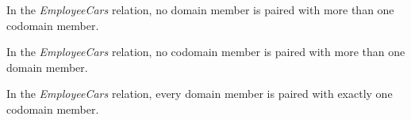 \documentclass{ximera}
\begin{document}
\begin{exercise}
\begin{question} 
In the \textit{EmployeeCars} relation, no domain member is paired with more than one codomain member.

\begin{multipleChoice}
\end{multipleChoice}
\end{question}








\begin{question} 
In the \textit{EmployeeCars} relation, no codomain member is paired with more than one domain member.

\begin{multipleChoice}
\end{multipleChoice}
\end{question}








\begin{question} 
In the \textit{EmployeeCars} relation, every domain member is paired with exactly one codomain member.

\begin{multipleChoice}
\end{multipleChoice}
\end{question}







\end{exercise}
\end{document}
